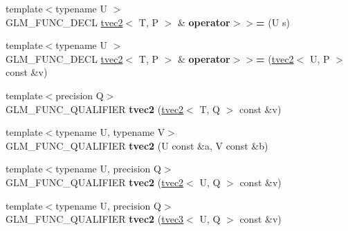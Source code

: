 \begin{DoxyCompactItemize}
\item 
\hypertarget{structglm_1_1detail_1_1tvec2_a7198fd5d5bacb28ad4e7709856126fa5}{{\footnotesize template$<$typename U $>$ }\\G\-L\-M\-\_\-\-F\-U\-N\-C\-\_\-\-D\-E\-C\-L \hyperlink{structglm_1_1detail_1_1tvec2}{tvec2}$<$ T, P $>$ \& {\bfseries operator$>$$>$=} (U s)}\label{structglm_1_1detail_1_1tvec2_a7198fd5d5bacb28ad4e7709856126fa5}

\item 
\hypertarget{structglm_1_1detail_1_1tvec2_aa5b4c36cf93fa89e33911f74c7352284}{{\footnotesize template$<$typename U $>$ }\\G\-L\-M\-\_\-\-F\-U\-N\-C\-\_\-\-D\-E\-C\-L \hyperlink{structglm_1_1detail_1_1tvec2}{tvec2}$<$ T, P $>$ \& {\bfseries operator$>$$>$=} (\hyperlink{structglm_1_1detail_1_1tvec2}{tvec2}$<$ U, P $>$ const \&v)}\label{structglm_1_1detail_1_1tvec2_aa5b4c36cf93fa89e33911f74c7352284}

\item 
\hypertarget{structglm_1_1detail_1_1tvec2_a34375ce019c83789e03dc185c9025bee}{{\footnotesize template$<$precision Q$>$ }\\G\-L\-M\-\_\-\-F\-U\-N\-C\-\_\-\-Q\-U\-A\-L\-I\-F\-I\-E\-R {\bfseries tvec2} (\hyperlink{structglm_1_1detail_1_1tvec2}{tvec2}$<$ T, Q $>$ const \&v)}\label{structglm_1_1detail_1_1tvec2_a34375ce019c83789e03dc185c9025bee}

\item 
\hypertarget{structglm_1_1detail_1_1tvec2_a1057576a2eab171002a8ff2bf4bd68ad}{{\footnotesize template$<$typename U, typename V$>$ }\\G\-L\-M\-\_\-\-F\-U\-N\-C\-\_\-\-Q\-U\-A\-L\-I\-F\-I\-E\-R {\bfseries tvec2} (U const \&a, V const \&b)}\label{structglm_1_1detail_1_1tvec2_a1057576a2eab171002a8ff2bf4bd68ad}

\item 
\hypertarget{structglm_1_1detail_1_1tvec2_a8ea4daf34f1286102f8a0fc565b1376d}{{\footnotesize template$<$typename U, precision Q$>$ }\\G\-L\-M\-\_\-\-F\-U\-N\-C\-\_\-\-Q\-U\-A\-L\-I\-F\-I\-E\-R {\bfseries tvec2} (\hyperlink{structglm_1_1detail_1_1tvec2}{tvec2}$<$ U, Q $>$ const \&v)}\label{structglm_1_1detail_1_1tvec2_a8ea4daf34f1286102f8a0fc565b1376d}

\item 
\hypertarget{structglm_1_1detail_1_1tvec2_a9dd6ae59acae6434a5ca48e06b01953d}{{\footnotesize template$<$typename U, precision Q$>$ }\\G\-L\-M\-\_\-\-F\-U\-N\-C\-\_\-\-Q\-U\-A\-L\-I\-F\-I\-E\-R {\bfseries tvec2} (\hyperlink{structglm_1_1detail_1_1tvec3}{tvec3}$<$ U, Q $>$ const \&v)}\label{structglm_1_1detail_1_1tvec2_a9dd6ae59acae6434a5ca48e06b01953d}


\end{DoxyCompactItemize}
